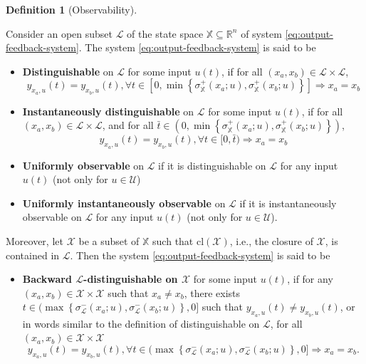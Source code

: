 \documentclass[
]{book}
\providecommand{\tightlist}{%
  \setlength{\itemsep}{0pt}\setlength{\parskip}{0pt}}
\theoremstyle{definition}
\newtheorem{definition}{Definition}[chapter]
\theoremstyle{definition}
\theoremstyle{definition}
\theoremstyle{definition}
\theoremstyle{remark}
\begin{document}
\begin{definition}[Observability]
\protect\hypertarget{def:observability}{}\label{def:observability}

Consider an open subset \(\mathcal{L}\) of the state space \(\mathbb{X} \subseteq \mathbb{R}^n\) of system \eqref{eq:output-feedback-system}. The system \eqref{eq:output-feedback-system} is said to be

\begin{itemize}
\item
  \textbf{Distinguishable} on \(\mathcal{L}\) for some input \(u(t)\), if for all \((x_a,x_b) \in \mathcal{L} \times \mathcal{L}\),
  \[
  y_{x_a,u}(t) = y_{x_b,u}(t), \forall t \in [0,\min\left\{\sigma^+_{\mathbb{X}}(x_a;u), \sigma^+_{\mathbb{X}}(x_b;u) \right\}] \Longrightarrow x_a = x_b
  \]
\item
  \textbf{Instantaneously distinguishable} on \(\mathcal{L}\) for some input \(u(t)\), if for all \((x_a,x_b) \in \mathcal{L} \times \mathcal{L}\), and for all \(\bar{t} \in (0, \min\left\{\sigma^+_{\mathbb{X}}(x_a;u), \sigma^+_{\mathbb{X}}(x_b;u) \right\})\),
  \[
  y_{x_a,u}(t) = y_{x_b,u}(t), \forall t \in [0,\bar{t}) \Longrightarrow x_a = x_b
  \]
\item
  \textbf{Uniformly observable} on \(\mathcal{L}\) if it is distinguishable on \(\mathcal{L}\) for any input \(u(t)\) (not only for \(u \in \mathcal{U}\))
\item
  \textbf{Uniformly instantaneously observable} on \(\mathcal{L}\) if it is instantaneously observable on \(\mathcal{L}\) for any input \(u(t)\) (not only for \(u \in \mathcal{U}\)).
\end{itemize}

Moreover, let \(\mathcal{X}\) be a subset of \(\mathbb{X}\) such that \(\mathrm{cl}(\mathcal{X})\), i.e., the closure of \(\mathcal{X}\), is contained in \(\mathcal{L}\). Then the system \eqref{eq:output-feedback-system} is said to be

\begin{itemize}
\tightlist
\item
  \textbf{Backward \(\mathcal{L}\)-distinguishable on \(\mathcal{X}\)} for some input \(u(t)\), if for any \((x_a,x_b) \in \mathcal{X} \times \mathcal{X}\) such that \(x_a \neq x_b\), there exists \(t \in (\max\left\{ \sigma^{-}_{\mathcal{L}}(x_a;u), \sigma^{-}_{\mathcal{L}}(x_b;u) \right\},0]\) such that \(y_{x_a,u}(t) \neq y_{x_b,u}(t)\), or in words similar to the definition of distinguishable on \(\mathcal{L}\), for all \((x_a,x_b) \in \mathcal{X} \times \mathcal{X}\)
  \[
  y_{x_a,u}(t) = y_{x_b,u}(t), \forall t \in (\max\left\{\sigma^{-}_{\mathcal{L}}(x_a;u), \sigma^{-}_{\mathcal{L}}(x_b;u) \right\},0] \Longrightarrow x_a = x_b.
  \]
\end{itemize}

\end{definition}
\end{document}
